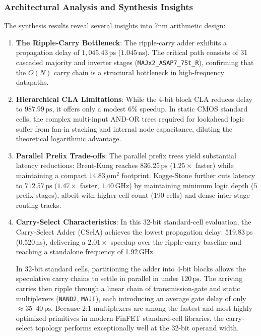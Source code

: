 \subsubsection{Architectural Analysis and Synthesis Insights}

The synthesis results reveal several insights into 7nm arithmetic design:
\begin{enumerate}
    \item \textbf{The Ripple-Carry Bottleneck}: The ripple-carry adder exhibits a propagation delay of $1,045.43\,\text{ps}$ ($1.045\,\text{ns}$). The critical path consists of 31 cascaded majority and inverter stages (\texttt{MAJx2\_ASAP7\_75t\_R}), confirming that the $O(N)$ carry chain is a structural bottleneck in high-frequency datapaths.
    
    \item \textbf{Hierarchical CLA Limitations}: While the 4-bit block CLA reduces delay to $987.99\,\text{ps}$, it offers only a modest $6\%$ speedup. In static CMOS standard cells, the complex multi-input AND-OR trees required for lookahead logic suffer from fan-in stacking and internal node capacitance, diluting the theoretical logarithmic advantage.
    
    \item \textbf{Parallel Prefix Trade-offs}: The parallel prefix trees yield substantial latency reductions: Brent-Kung reaches $836.25\,\text{ps}$ ($1.25\times$ faster) while maintaining a compact $14.83\,\mu\text{m}^2$ footprint. Kogge-Stone further cuts latency to $712.57\,\text{ps}$ ($1.47\times$ faster, $1.40\,\text{GHz}$) by maintaining minimum logic depth ($5$ prefix stages), albeit with higher cell count (190 cells) and dense inter-stage routing tracks.
    
    \item \textbf{Carry-Select Characteristics}: In this 32-bit standard-cell evaluation, the Carry-Select Adder (CSelA) achieves the lowest propagation delay: 519.83\,ps (0.520\,ns), delivering a $2.01\times$ speedup over the ripple-carry baseline and reaching a standalone frequency of 1.92\,GHz.
    
    In 32-bit standard cells, partitioning the adder into 4-bit blocks allows the speculative carry chains to settle in parallel in under $120\,\text{ps}$. The arriving carries then ripple through a linear chain of transmission-gate and static multiplexers (\texttt{NAND2}, \texttt{MAJI}), each introducing an average gate delay of only $\approx 35\text{--}40\,\text{ps}$. Because 2:1 multiplexers are among the fastest and most highly optimized primitives in modern FinFET standard-cell libraries, the carry-select topology performs exceptionally well at the 32-bit operand width.
    

\end{enumerate}
